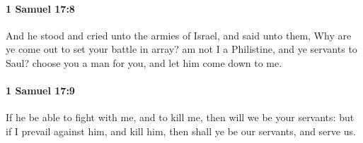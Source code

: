 		\paragraph{1 Samuel 17:8} %
			\label{1SAMUEL-17-8}

			And he stood and cried unto the armies of Israel, and said unto them, Why are ye come out to set your battle in array? am not I a Philistine, and ye servants to Saul? choose you a man for you, and let him come down to me.


		\paragraph{1 Samuel 17:9} %
			\label{1SAMUEL-17-9}

			If he be able to fight with me, and to kill me, then will we be your servants: but if I prevail against him, and kill him, then shall ye be our servants, and serve us.

